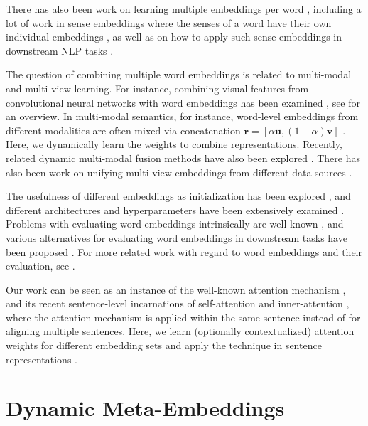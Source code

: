 \documentclass[11pt,a4paper]{article}
\begin{document}
There has also been work on learning multiple embeddings per word \cite{Chen:2014emnlp,Neelakantan:2015arxiv,Vu:2016naacl}, including a lot of work in sense embeddings where the senses of a word have their own individual embeddings \cite{Iacobacci:2015acl,Qiu:2016emnlp}, as well as on how to apply such sense embeddings in downstream NLP tasks \cite{Pilehvar:2017arxiv}.

The question of combining multiple word embeddings is related to multi-modal and multi-view learning. For instance, combining visual features from convolutional neural networks with word embeddings has been examined \cite{Kiela:2014emnlp,Lazaridou:2015arxiv}, see  for an overview. In multi-modal semantics, for instance, word-level embeddings from different modalities are often mixed via concatenation $\mathbf{r} = [\alpha \mathbf{u}, (1-\alpha) \mathbf{v}]$ \cite{Bruni:2014jair}. Here, we dynamically learn the weights to combine representations. Recently, related dynamic multi-modal fusion methods have also been explored \cite{Wang:2018arxiv,Kiros:2018acl}. There has also been work on unifying multi-view embeddings from different data sources \cite{Luo:2014}.

The usefulness of different embeddings as initialization has been explored \cite{Kocmi:2017arxiv}, and different architectures and hyperparameters have been extensively examined \cite{Levy:2015tacl}. Problems with evaluating word embeddings intrinsically are well known \cite{Faruqui:2016arxiv}, and various alternatives for evaluating word embeddings in downstream tasks have been proposed \cite[e.g.,][]{Tsvetkov:2015emnlp,Schnabel:2015emnlp,Ettinger:2016repeval}. For more related work with regard to word embeddings and their evaluation, see .

Our work can be seen as an instance of the well-known attention mechanism \cite{Bahdanau:2014arxiv}, and its recent sentence-level incarnations of self-attention \cite{Lin:2017arxiv} and inner-attention \cite{Cheng:2016arxiv,Liu:2016arxiv}, where the attention mechanism is applied within the same sentence instead of for aligning multiple sentences. Here, we learn (optionally contextualized) attention weights for different embedding sets and apply the technique in sentence representations \cite{Kiros:2015nips,Wieting:2015arxiv,Hill:2016arxiv,Conneau:2017emnlp}.

\section{Dynamic Meta-Embeddings}
\end{document}
